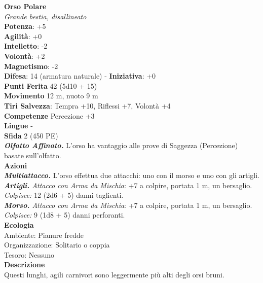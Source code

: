 \begin{multicols}{2}
\medskip\textbf{Orso Polare}\\
\emph{Grande bestia, disallineato}\\
\textbf{Potenza}: +5\\
\textbf{Agilità}: +0\\
\textbf{Intelletto}: -2\\
\textbf{Volontà}: +2\\
\textbf{Magnetismo}: -2\\
\textbf{Difesa}: 14 (armatura naturale) - \textbf{Iniziativa}: +0\\
\textbf{Punti Ferita} 42 (5d10 + 15)\\
\textbf{Movimento} 12 m, nuoto 9 m\\
\textbf{Tiri Salvezza}: Tempra +10, Riflessi +7, Volontà +4 \\
\textbf{Competenze} Percezione +3\\
\textbf{Lingue} -\\
\textbf{Sfida} 2 (450 PE)\smallskip\\
\emph{\textbf{Olfatto Affinato.}} L'orso ha vantaggio alle prove di Saggezza (Percezione) basate sull'olfatto.\\
\smallskip\textbf{Azioni}\\
\emph{\textbf{Multiattacco.}} L'orso effettua due attacchi: uno con il morso e uno con gli artigli.\\
\emph{\textbf{Artigli.} Attacco con Arma da Mischia}: +7 a colpire, portata 1 m, un bersaglio.\\
\emph{Colpisce:} 12 (2d6 + 5) danni taglienti.\\
\emph{\textbf{Morso.} Attacco con Arma da Mischia}: +7 a colpire, portata 1 m, un bersaglio.\\
\emph{Colpisce:} 9 (1d8 + 5) danni perforanti.\\
\textbf{Ecologia}\\
Ambiente: Pianure fredde\\
Organizzazione: Solitario o coppia\\
Tesoro: Nessuno\\
\textbf{Descrizione}\\

Questi lunghi, agili carnivori sono leggermente più alti degli orsi bruni. \\


\end{multicols}
